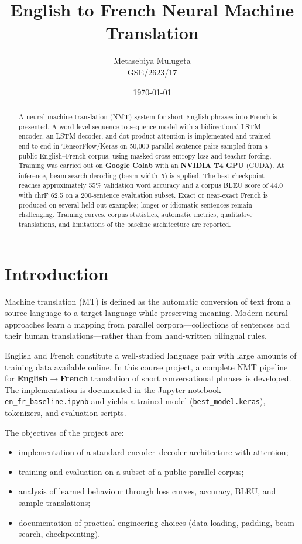 \documentclass[12pt]{article}
\title{\textbf{English to French Neural Machine Translation}}
\author{Metasebiya Mulugeta \\ GSE/2623/17}
\date{\today}
\begin{document}
\maketitle

\begin{abstract}
A neural machine translation (NMT) system for short English phrases into French is presented. A word-level sequence-to-sequence model with a bidirectional LSTM encoder, an LSTM decoder, and dot-product attention is implemented and trained end-to-end in TensorFlow/Keras on 50{,}000 parallel sentence pairs sampled from a public English--French corpus, using masked cross-entropy loss and teacher forcing. Training was carried out on \textbf{Google Colab} with an \textbf{NVIDIA T4 GPU} (CUDA). At inference, beam search decoding (beam width~5) is applied. The best checkpoint reaches approximately 55\% validation word accuracy and a corpus BLEU score of 44.0 with chrF 62.5 on a 200-sentence evaluation subset. Exact or near-exact French is produced on several held-out examples; longer or idiomatic sentences remain challenging. Training curves, corpus statistics, automatic metrics, qualitative translations, and limitations of the baseline architecture are reported.
\end{abstract}

\section{Introduction}
\label{sec:intro}

Machine translation (MT) is defined as the automatic conversion of text from a source language to a target language while preserving meaning. Modern neural approaches learn a mapping from parallel corpora---collections of sentences and their human translations---rather than from hand-written bilingual rules.

English and French constitute a well-studied language pair with large amounts of training data available online. In this course project, a complete NMT pipeline for \textbf{English$\rightarrow$French} translation of short conversational phrases is developed. The implementation is documented in the Jupyter notebook \texttt{en\_fr\_baseline.ipynb} and yields a trained model (\texttt{best\_model.keras}), tokenizers, and evaluation scripts.

The objectives of the project are:
\begin{itemize}
  \item implementation of a standard encoder--decoder architecture with attention;
  \item training and evaluation on a subset of a public parallel corpus;
  \item analysis of learned behaviour through loss curves, accuracy, BLEU, and sample translations;
  \item documentation of practical engineering choices (data loading, padding, beam search, checkpointing).
\end{itemize}
\end{document}
